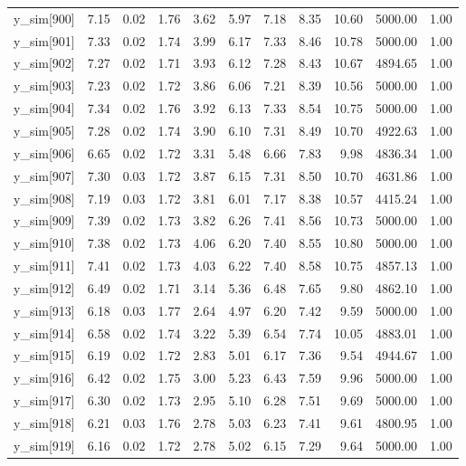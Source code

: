\begin{table}[ht]
\begin{tabular}{rrrrrrrrrrr}
  y\_sim[900] & 7.15 & 0.02 & 1.76 & 3.62 & 5.97 & 7.18 & 8.35 & 10.60 & 5000.00 & 1.00 \\ 
  y\_sim[901] & 7.33 & 0.02 & 1.74 & 3.99 & 6.17 & 7.33 & 8.46 & 10.78 & 5000.00 & 1.00 \\ 
  y\_sim[902] & 7.27 & 0.02 & 1.71 & 3.93 & 6.12 & 7.28 & 8.43 & 10.67 & 4894.65 & 1.00 \\ 
  y\_sim[903] & 7.23 & 0.02 & 1.72 & 3.86 & 6.06 & 7.21 & 8.39 & 10.56 & 5000.00 & 1.00 \\ 
  y\_sim[904] & 7.34 & 0.02 & 1.76 & 3.92 & 6.13 & 7.33 & 8.54 & 10.75 & 5000.00 & 1.00 \\ 
  y\_sim[905] & 7.28 & 0.02 & 1.74 & 3.90 & 6.10 & 7.31 & 8.49 & 10.70 & 4922.63 & 1.00 \\ 
  y\_sim[906] & 6.65 & 0.02 & 1.72 & 3.31 & 5.48 & 6.66 & 7.83 & 9.98 & 4836.34 & 1.00 \\ 
  y\_sim[907] & 7.30 & 0.03 & 1.72 & 3.87 & 6.15 & 7.31 & 8.50 & 10.70 & 4631.86 & 1.00 \\ 
  y\_sim[908] & 7.19 & 0.03 & 1.72 & 3.81 & 6.01 & 7.17 & 8.38 & 10.57 & 4415.24 & 1.00 \\ 
  y\_sim[909] & 7.39 & 0.02 & 1.73 & 3.82 & 6.26 & 7.41 & 8.56 & 10.73 & 5000.00 & 1.00 \\ 
  y\_sim[910] & 7.38 & 0.02 & 1.73 & 4.06 & 6.20 & 7.40 & 8.55 & 10.80 & 5000.00 & 1.00 \\ 
  y\_sim[911] & 7.41 & 0.02 & 1.73 & 4.03 & 6.22 & 7.40 & 8.58 & 10.75 & 4857.13 & 1.00 \\ 
  y\_sim[912] & 6.49 & 0.02 & 1.71 & 3.14 & 5.36 & 6.48 & 7.65 & 9.80 & 4862.10 & 1.00 \\ 
  y\_sim[913] & 6.18 & 0.03 & 1.77 & 2.64 & 4.97 & 6.20 & 7.42 & 9.59 & 5000.00 & 1.00 \\ 
  y\_sim[914] & 6.58 & 0.02 & 1.74 & 3.22 & 5.39 & 6.54 & 7.74 & 10.05 & 4883.01 & 1.00 \\ 
  y\_sim[915] & 6.19 & 0.02 & 1.72 & 2.83 & 5.01 & 6.17 & 7.36 & 9.54 & 4944.67 & 1.00 \\ 
  y\_sim[916] & 6.42 & 0.02 & 1.75 & 3.00 & 5.23 & 6.43 & 7.59 & 9.96 & 5000.00 & 1.00 \\ 
  y\_sim[917] & 6.30 & 0.02 & 1.73 & 2.95 & 5.10 & 6.28 & 7.51 & 9.69 & 5000.00 & 1.00 \\ 
  y\_sim[918] & 6.21 & 0.03 & 1.76 & 2.78 & 5.03 & 6.23 & 7.41 & 9.61 & 4800.95 & 1.00 \\ 
  y\_sim[919] & 6.16 & 0.02 & 1.72 & 2.78 & 5.02 & 6.15 & 7.29 & 9.64 & 5000.00 & 1.00 \\ 

\end{tabular}
\end{table}
